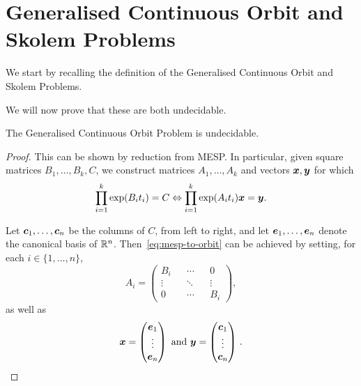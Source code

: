 \section{Generalised Continuous Orbit and Skolem Problems}

We start by recalling the definition of the Generalised Continuous Orbit and Skolem Problems.

\generalisedproblems*

We will now prove that these are both undecidable.

\begin{theorem}
The Generalised Continuous Orbit Problem is undecidable.
\end{theorem}

\begin{proof}
This can be shown by reduction from MESP. In particular, given square matrices $B_{1}, \ldots, B_{k}, C$, we construct matrices $A_{1}, \ldots, A_{k}$ and vectors $\boldsymbol{x}, \boldsymbol{y}$ for which
\begin{equation}
  \label{eq:mesp-to-orbit}
\prod \limits_{i=1}^{k} \exp(B_{i} t_{i}) = C \Leftrightarrow
\prod \limits_{i=1}^{k} \exp(A_{i} t_{i}) \myvector{x} = \myvector{y} .
\end{equation}

Let $\boldsymbol{c}_{1}, \ldots, \boldsymbol{c}_{n}$ be the columns of $C$, from left to right, and let $\boldsymbol{e}_{1}, \ldots, \boldsymbol{e}_{n}$ denote the canonical basis of $\mathbb{R}^{n}$. Then~\eqref{eq:mesp-to-orbit} can be achieved by setting, for each $i \in \lbrace 1, \ldots, n \rbrace$,
\begin{equation*}
A_{i} =
\begin{pmatrix}
B_{i} && \cdots && 0 \\
\vdots && \ddots && \vdots \\
0 && \cdots && B_{i}
\end{pmatrix},
\end{equation*}
as well as
\begin{equation*}
\boldsymbol{x} = \begin{pmatrix} \boldsymbol{e}_{1} \\ \vdots \\ \boldsymbol{e}_{n} \end{pmatrix} \mbox{ and }
\boldsymbol{y} = \begin{pmatrix} \boldsymbol{c}_{1} \\ \vdots \\ \boldsymbol{c}_{n} \end{pmatrix} \, .
\end{equation*}
\end{proof}

